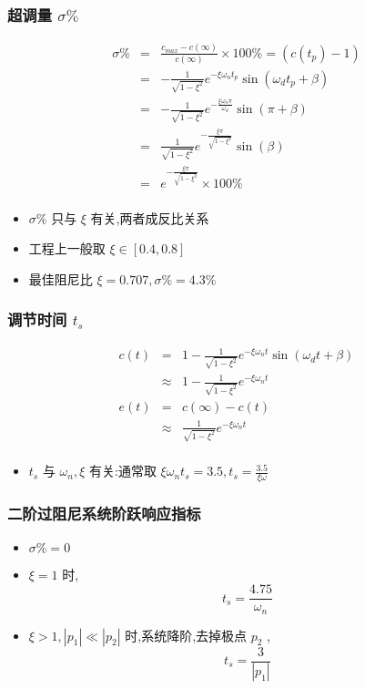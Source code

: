 \documentclass{beamer}
\begin{document}
\begin{frame}
\frametitle{超调量 $\sigma \%$}
\label{sec-3-4}

\begin{eqnarray*}
\sigma \% & = & \frac{c_{max}-c(\infty)}{c(\infty)}\times 100\% 
         = (c(t_p)-1) \\
         &=& -\frac{1}{\sqrt{1-\xi^2}}e^{-\xi\omega_n t_p}\sin(\omega_d t_p+\beta) \\
         &=& -\frac{1}{\sqrt{1-\xi^2}}e^{-\frac{\xi\omega_n\pi}{\omega_d}}\sin(\pi+\beta) \\
         &=& \frac{1}{\sqrt{1-\xi^2}}e^{-\frac{\xi\pi}{\sqrt{1-\xi^2}}}\sin(\beta) \\
         &=& e^{-\frac{\xi\pi}{\sqrt{1-\xi^2}}}\times 100\% \\
\end{eqnarray*}

\begin{itemize}
\item <2->$\sigma\%$ 只与 $\xi$ 有关,两者成反比关系
\item <3->工程上一般取 $\xi\in[0.4,0.8]$
\item <4->最佳阻尼比 $\xi=0.707,\sigma\%=4.3\%$
\end{itemize}
\end{frame}
\begin{frame}
\frametitle{调节时间 $t_s$}
\label{sec-3-5}



\begin{eqnarray*}
c(t) & = & 1-\frac{1}{\sqrt{1-\xi^2}}e^{-\xi\omega_n t}\sin(\omega_d t+\beta)\\
     &\approx & 1-\frac{1}{\sqrt{1-\xi^2}}e^{-\xi\omega_n t} \\
e(t) &=& c(\infty)-c(t) \\
    &\approx& \frac{1}{\sqrt{1-\xi^2}}e^{-\xi\omega_n t}\\ 
\end{eqnarray*}

\begin{itemize}
\item <2-> $t_s$ 与 $\omega_n,\xi$ 有关:通常取 $\xi\omega_n t_s = 3.5,t_s=\frac{3.5}{\xi\omega}$
\end{itemize}
       
\end{frame}
\begin{frame}
\frametitle{二阶过阻尼系统阶跃响应指标}
\label{sec-3-6}

\begin{itemize}
\item <2->$\sigma\%=0$
\item <3->$\xi=1$ 时, 
       \[t_s=\frac{4.75}{\omega_n}\]
\item <4->$\xi>1,|p_1|\ll |p_2|$ 时,系统降阶,去掉极点 $p_2$ , 
      \[t_s=\frac{3}{|p_1|}\]
\end{itemize}
\end{frame}
\end{document}

